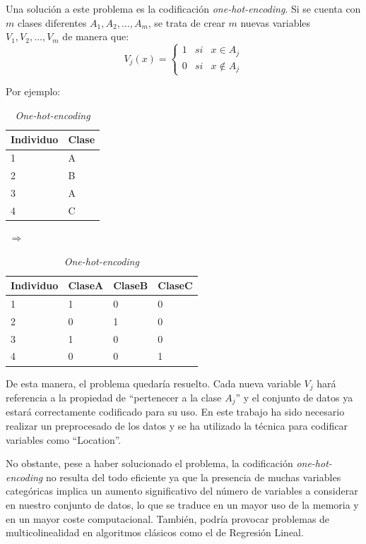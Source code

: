 \documentclass[12pt,twoside]{article}
\begin{document}
Una solución a este problema es la codificación \textit{one-hot-encoding}. Si se cuenta con $m$ clases diferentes $A_1, A_2, \dots, A_m$, se trata de crear $m$ nuevas variables $V_1, V_2, \dots, V_m$ de manera que:
\begin{equation*}
V_j(x) = 
\left\{
\begin{array}{ccc}
1 & si & x \in A_j \\
0 & si & x \not\in A_j
\end{array}
\right.
\end{equation*}

\newpage
Por ejemplo:
\begin{table}[h]
\centering
\begin{tabular}{|l|l|}
\hline
Individuo & Clase \\ \hline
1         & A     \\ \hline
2         & B     \\ \hline
3         & A     \\ \hline
4         & C     \\ \hline
\end{tabular}
$\, \, \Rightarrow \, \,$
\begin{tabular}{|l|l|l|l|}
\hline
Individuo & ClaseA & ClaseB & ClaseC \\ \hline
1         & 1 & 0 & 0     \\ \hline
2         & 0 & 1 & 0     \\ \hline
3         & 1 & 0 & 0     \\ \hline
4         & 0 & 0 & 1     \\ \hline
\end{tabular}
\caption{\textit{One-hot-encoding}}
\end{table}

De esta manera, el problema quedaría resuelto. Cada nueva variable $V_j$ hará referencia a la propiedad de ``pertenecer a la clase $A_j$'' y el conjunto de datos ya estará correctamente codificado para su uso. En este trabajo ha sido necesario realizar un preprocesado de los datos y se ha utilizado la técnica para codificar variables como ``Location''.

No obstante, pese a haber solucionado el problema, la codificación \textit{one-hot-encoding} no resulta del todo eficiente ya que la presencia de muchas variables categóricas implica un aumento significativo del número de variables a considerar en nuestro conjunto de datos, lo que se traduce en un mayor uso de la memoria y en un mayor coste computacional. También, podría provocar problemas de multicolinealidad en algoritmos clásicos como el de Regresión Lineal.
\end{document}
